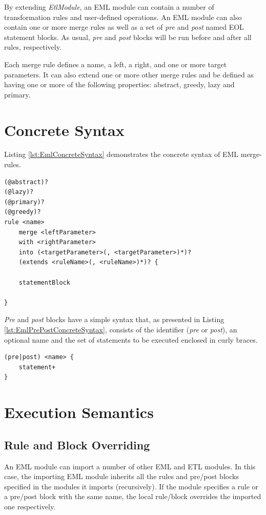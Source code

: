 By extending \emph{EtlModule}, an EML module can contain a number of transformation rules and user-defined operations. An EML module can also contain one or more merge rules as well as a set of \emph{pre} and \emph{post} named EOL statement blocks. As usual, \emph{pre} and \emph{post} blocks will be run before and after all rules, respectively.

Each merge rule defines a name, a left, a right, and one or more target parameters. It can also extend one or more other merge rules and be defined as having one or more of the following properties: abstract, greedy, lazy and primary.

\section{Concrete Syntax}

Listing \ref{lst:EmlConcreteSyntax} demonstrates the concrete syntax of EML merge-rules.

\begin{lstlisting}[float=tbp, caption=Concrete syntax of an EML merge-rule, label=lst:EmlConcreteSyntax, language=EML]
(@abstract)?
(@lazy)?
(@primary)?
(@greedy)?
rule <name>
	merge <leftParameter>
	with <rightParameter>
	into (<targetParameter>(, <targetParameter>)*)?
	(extends <ruleName>(, <ruleName>)*)? {

	statementBlock
	
}
\end{lstlisting}

\emph{Pre} and \emph{post} blocks have a simple syntax that, as presented in Listing \ref{lst:EmlPrePostConcreteSyntax}, consists of the identifier (\emph{pre} or \emph{post}), an optional name and the set of statements to be executed enclosed in curly braces.

\begin{lstlisting}[float=tbp, caption=Concrete Syntax of Pre and Post blocks, label=lst:EmlPrePostConcreteSyntax, language=EML]
(pre|post) <name> {
	statement+
}
\end{lstlisting}

\section{Execution Semantics}

\subsection{Rule and Block Overriding}
An EML module can import a number of other EML and ETL modules. In this case, the importing EML module inherits all the rules and pre/post blocks specified in the modules it imports (recursively). If the module specifies a rule or a pre/post block with the same name, the local rule/block overrides the imported one respectively.

